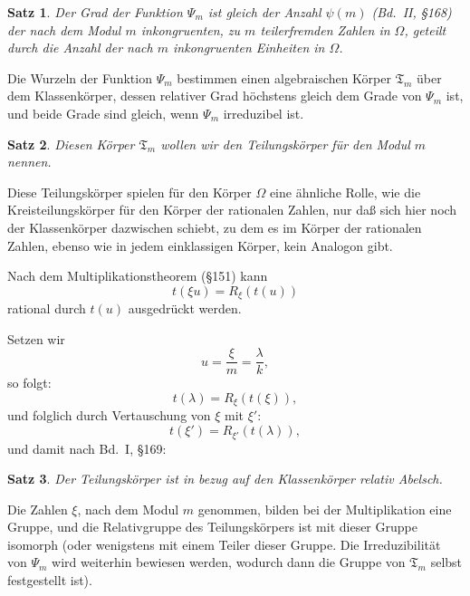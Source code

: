 \documentclass[12pt,a4paper]{article}
\newtheorem*{satz}{Satz}
\begin{document}
\begin{satz}
Der Grad der Funktion $\Psi_m$ ist gleich der Anzahl $\psi(m)$ (Bd.~II, \S 168) der nach dem Modul $m$ inkongruenten, zu $m$ teilerfremden Zahlen in $\Omega$, geteilt durch die Anzahl der nach $m$ inkongruenten Einheiten in $\Omega$.
\end{satz}

Die Wurzeln der Funktion $\Psi_m$ bestimmen einen algebraischen K\"orper $\mathfrak{T}_m$ \"uber dem Klassenk\"orper, dessen relativer Grad h\"ochstens gleich dem Grade von $\Psi_m$ ist, und beide Grade sind gleich, wenn $\Psi_m$ irreduzibel ist.

\begin{satz}
Diesen K\"orper $\mathfrak{T}_m$ wollen wir den Teilungsk\"orper f\"ur den Modul $m$ nennen.
\end{satz}

Diese Teilungsk\"orper spielen f\"ur den K\"orper $\Omega$ eine \"ahnliche Rolle, wie die Kreisteilungsk\"orper f\"ur den K\"orper der rationalen Zahlen, nur da\ss{} sich hier noch der Klassenk\"orper dazwischen schiebt, zu dem es im K\"orper der rationalen Zahlen, ebenso wie in jedem einklassigen K\"orper, kein Analogon gibt.

Nach dem Multiplikationstheorem (\S 151) kann
\begin{equation}t(\xi u) = R_\xi(t(u))\end{equation}
rational durch $t(u)$ ausgedr\"uckt werden.

Setzen wir
\[u = \frac{\xi}{m} = \frac{\lambda}{k},\]
so folgt:
\begin{equation}t(\lambda) = R_\xi(t(\xi)),\end{equation}
und folglich durch Vertauschung von $\xi$ mit $\xi'$:
\begin{equation}t(\xi') = R_{\xi'}(t(\lambda)),\end{equation}
und damit nach Bd.~I, \S 169:

\begin{satz}
Der Teilungsk\"orper ist in bezug auf den Klassenk\"orper relativ Abelsch.
\end{satz}

Die Zahlen $\xi$, nach dem Modul $m$ genommen, bilden bei der Multiplikation eine Gruppe, und die Relativgruppe des Teilungsk\"orpers ist mit dieser Gruppe isomorph (oder wenigstens mit einem Teiler dieser Gruppe. Die Irreduzibilit\"at von $\Psi_m$ wird weiterhin bewiesen werden, wodurch dann die Gruppe von $\mathfrak{T}_m$ selbst festgestellt ist).
\end{document}
